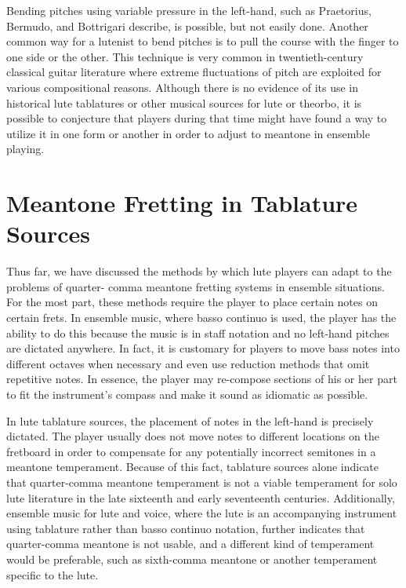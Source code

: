 Bending pitches using variable pressure in the left-hand, such as Praetorius, Bermudo, and
Bottrigari describe, is possible, but not easily done. Another common way for a lutenist to bend
pitches is to pull the course with the finger to one side or the other. This technique is very
common in twentieth-century classical guitar literature where extreme fluctuations of pitch are
exploited for various compositional reasons. Although there is no evidence of its use in historical
lute tablatures or other musical sources for lute or theorbo, it is possible to conjecture that
players during that time might have found a way to utilize it in one form or another in order to
adjust to meantone in ensemble playing.

\section{Meantone Fretting in Tablature Sources}

Thus far, we have discussed the methods by which lute players can adapt to the problems of quarter-
comma meantone fretting systems in ensemble situations.  For the most part, these methods require
the player to place certain notes on certain frets.  In ensemble music, where basso continuo is
used, the player has the ability to do this because the music is in staff notation and no left-hand
pitches are dictated anywhere.  In fact, it is customary for players to move bass notes into
different octaves when necessary and even use reduction methods that omit repetitive notes.  In
essence, the player may re-compose sections of his or her part to fit the instrument's compass and
make it sound as idiomatic as possible.

In lute tablature sources, the placement of notes in the left-hand is precisely dictated. The player
usually does not move notes to different locations on the fretboard in order to compensate for any
potentially incorrect semitones in a meantone temperament.  Because of this fact, tablature
sources alone indicate that quarter-comma meantone temperament is not a viable temperament for solo
lute literature in the late sixteenth and early seventeenth centuries. Additionally, ensemble music
for lute and voice, where the lute is an accompanying instrument using tablature rather than basso
continuo notation, further indicates that quarter-comma meantone is not usable, and a different kind
of temperament would be preferable, such as sixth-comma meantone or another temperament specific to
the lute.


